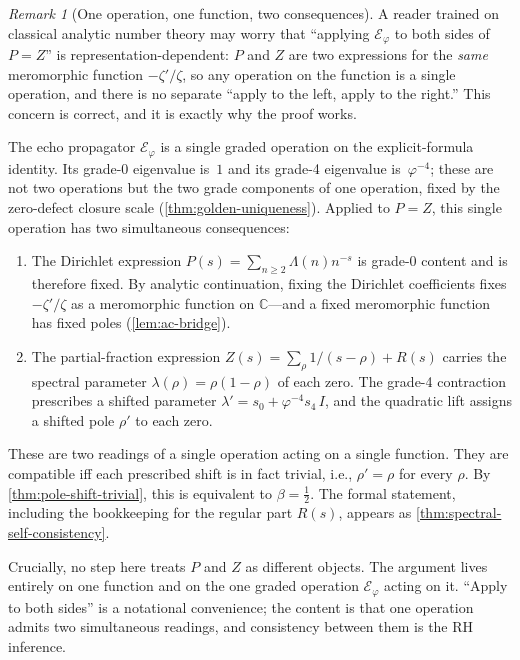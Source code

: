 \documentclass[11pt,a4paper]{article}
\theoremstyle{plain}
\theoremstyle{definition}
\theoremstyle{remark}
\newtheorem{remark}[theorem]{Remark}
\numberwithin{equation}{section}
\newcommand{\vp}{\varphi}
\begin{document}
\begin{remark}[One operation, one function, two consequences]
\label{rmk:propagator-not-external}
A reader trained on classical analytic number theory may worry that
``applying \(\mathcal{E}_\vp\) to both sides of \(P=Z\)'' is
representation-dependent: \(P\) and \(Z\) are two expressions for the
\emph{same} meromorphic function \(-\zeta'/\zeta\), so any operation
on the function is a single operation, and there is no separate
``apply to the left, apply to the right.''  This concern is correct,
and it is exactly why the proof works.

The echo propagator \(\mathcal{E}_\vp\) is a single graded operation
on the explicit-formula identity.  Its grade-0 eigenvalue is~\(1\)
and its grade-4 eigenvalue is~\(\vp^{-4}\); these are not two
operations but the two grade components of one operation, fixed by
the zero-defect closure scale (\cref{thm:golden-uniqueness}).
Applied to \(P=Z\), this single operation has two simultaneous
consequences:
\begin{enumerate}
  \item The Dirichlet expression \(P(s)=\sum_{n\ge2}\Lambda(n)n^{-s}\)
    is grade-0 content and is therefore fixed.  By analytic
    continuation, fixing the Dirichlet coefficients fixes
    \(-\zeta'/\zeta\) as a meromorphic function on
    \(\mathbb{C}\)---and a fixed meromorphic function has fixed
    poles (\cref{lem:ac-bridge}).
  \item The partial-fraction expression
    \(Z(s)=\sum_\rho 1/(s-\rho)+R(s)\) carries the spectral parameter
    \(\lambda(\rho)=\rho(1-\rho)\) of each zero.  The grade-4
    contraction prescribes a shifted parameter
    \(\lambda'=s_0+\vp^{-4}s_4\,I\), and the quadratic lift assigns
    a shifted pole \(\rho'\) to each zero.
\end{enumerate}
These are two readings of a single operation acting on a single
function.  They are compatible iff each prescribed shift is in fact
trivial, i.e., \(\rho'=\rho\) for every \(\rho\).  By
\cref{thm:pole-shift-trivial}, this is equivalent to
\(\beta=\tfrac12\).  The formal statement, including the bookkeeping
for the regular part \(R(s)\), appears as
\cref{thm:spectral-self-consistency}.

Crucially, no step here treats \(P\) and \(Z\) as different objects.
The argument lives entirely on one function and on the one graded
operation $\mathcal{E}_\vp$ acting on it.  ``Apply to both sides''
is a notational convenience; the content is that one operation
admits two simultaneous readings, and consistency between them is
the RH inference.
\end{remark}
\end{document}

